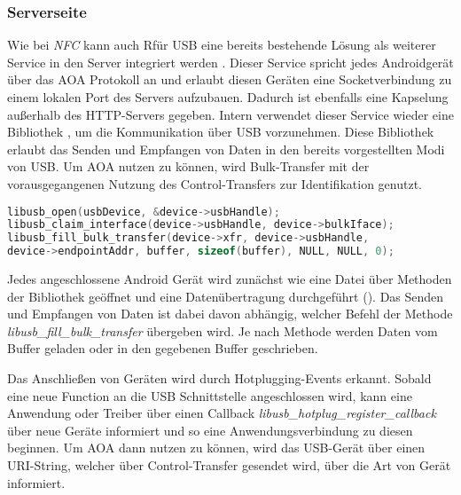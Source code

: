     \subsubsection{Serverseite}
        Wie bei {\it NFC} kann auch Rfür USB eine bereits bestehende Lösung als weiterer Service in den Server integriert werden \cite{aoaProxyAccessory}. Dieser Service spricht jedes Androidgerät über das AOA Protokoll an und erlaubt diesen Geräten eine Socketverbindung zu einem lokalen Port des Servers aufzubauen. Dadurch ist ebenfalls eine Kapselung außerhalb des HTTP-Servers gegeben. Intern verwendet dieser Service wieder eine Bibliothek \cite{libusb}, um die Kommunikation über USB vorzunehmen. Diese Bibliothek erlaubt das Senden und Empfangen von Daten in den bereits vorgestellten Modi von USB. Um AOA nutzen zu können, wird Bulk-Transfer mit der vorausgegangenen Nutzung des Control-Transfers zur Identifikation genutzt.
        \pagebreak
        \begin{lstlisting}[frame=bt, label={lst:usb:server}, language=C, caption=Verbindungsaufbau über USB (Servercode in C) \cite{aoaProxyAccessory}]
libusb_open(usbDevice, &device->usbHandle);
libusb_claim_interface(device->usbHandle, device->bulkIface);
libusb_fill_bulk_transfer(device->xfr, device->usbHandle,
device->endpointAddr, buffer, sizeof(buffer), NULL, NULL, 0);
        \end{lstlisting}
        
        Jedes angeschlossene Android Gerät wird zunächst wie eine Datei über Methoden der Bibliothek geöffnet und eine Datenübertragung durchgeführt (). Das Senden und Empfangen von Daten ist dabei davon abhängig, welcher Befehl der Methode {\it libusb\_fill\_bulk\_transfer} übergeben wird. Je nach Methode werden Daten vom Buffer geladen oder in den gegebenen Buffer geschrieben.
        
        Das Anschließen von Geräten wird durch Hotplugging-Events erkannt. Sobald eine neue Function an die USB Schnittstelle angeschlossen wird, kann eine Anwendung oder Treiber über einen Callback {\it libusb\_hotplug\_register\_callback} über neue Geräte informiert und so eine Anwendungsverbindung zu diesen beginnen. Um AOA dann nutzen zu können, wird das USB-Gerät über einen URI-String, welcher über Control-Transfer gesendet wird, über die Art von Gerät informiert.
